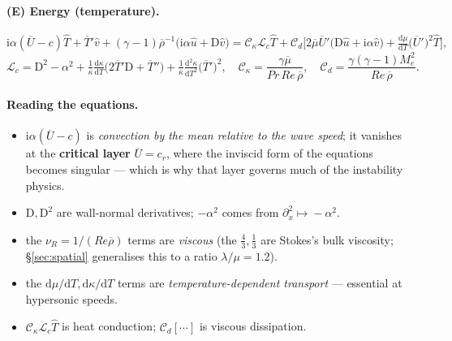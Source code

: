 \documentclass[11pt]{article}
\newcommand{\D}{\mathrm{D}}
\newcommand{\imag}{\mathrm{i}}
\newcommand{\Mae}{M_e}
\newcommand{\Ree}{\mathit{Re}}
\renewcommand{\bar}[1]{\overline{#1}}
\newcommand{\hatu}{\hat{u}}
\newcommand{\hatv}{\hat{v}}
\newcommand{\hatT}{\hat{T}}
\newcommand{\nuR}{\nu_{\!R}}
\begin{document}
\paragraph{(E) Energy (temperature).}
\begin{equation}\label{eq:energy}
  \imag\alpha(\bar U-c)\hatT+\bar T'\hatv+(\gamma-1)\bar\rho^{-1}\big(\imag\alpha\hatu+\D\hatv\big)
  =\mathcal C_\kappa\mathcal L_c\hatT
   +\mathcal C_d\Big[2\bar\mu\bar U'\big(\D\hatu+\imag\alpha\hatv\big)
     +\tfrac{\mathrm d\mu}{\mathrm dT}\big(\bar U'\big)^2\hatT\Big],
\end{equation}
\begin{equation}
  \mathcal L_c=\D^2-\alpha^2
   +\tfrac1{\bar\kappa}\tfrac{\mathrm d\kappa}{\mathrm dT}\big(2\bar T'\D+\bar T''\big)
   +\tfrac1{\bar\kappa}\tfrac{\mathrm d^2\kappa}{\mathrm dT^2}\big(\bar T'\big)^2,\quad
  \mathcal C_\kappa=\frac{\gamma\bar\mu}{\mathit{Pr}\,\Ree\,\bar\rho},\quad
  \mathcal C_d=\frac{\gamma(\gamma-1)\Mae^2}{\Ree\,\bar\rho}.
\end{equation}

\paragraph{Reading the equations.}
\begin{itemize}[nosep,leftmargin=1.6em]
  \item $\imag\alpha(\bar U-c)$ is \emph{convection by the mean relative to the wave speed}; it vanishes at
        the \textbf{critical layer} $\bar U=c_r$, where the inviscid form of the equations becomes singular ---
        which is why that layer governs much of the instability physics.
  \item $\D,\D^2$ are wall-normal derivatives; $-\alpha^2$ comes from $\partial_x^2\!\mapsto\!-\alpha^2$.
  \item the $\nuR=1/(\Ree\bar\rho)$ terms are \emph{viscous} (the $\tfrac43,\tfrac13$ are Stokes's bulk
        viscosity; \S\ref{sec:spatial} generalises this to a ratio $\lambda/\mu=1.2$).
  \item the $\mathrm d\mu/\mathrm dT,\mathrm d\kappa/\mathrm dT$ terms are \emph{temperature-dependent transport} ---
        essential at hypersonic speeds.
  \item $\mathcal C_\kappa\mathcal L_c\hatT$ is heat conduction; $\mathcal C_d[\cdots]$ is viscous dissipation.
\end{itemize}

\end{document}
